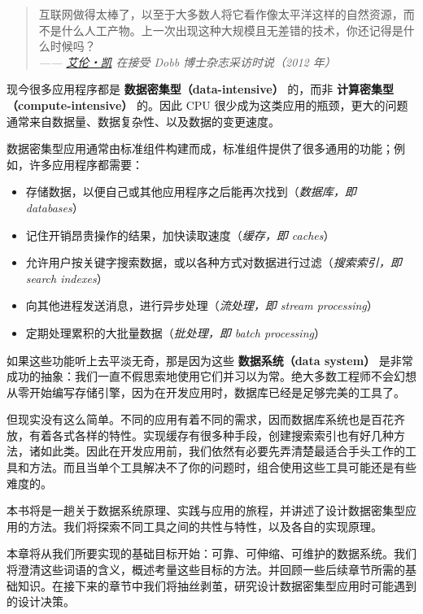 \begin{quote}
  互联网做得太棒了，以至于大多数人将它看作像太平洋这样的自然资源，而不是什么人工产物。上一次出现这种大规模且无差错的技术，你还记得是什么时候吗？\\
  \textit{—— \href{http://www.drdobbs.com/architecture-and-design/interview-with-alan-kay/240003442}{艾伦・凯} 在接受 Dobb 博士杂志采访时说（2012 年）}
\end{quote}

现今很多应用程序都是 \textbf{数据密集型（data-intensive）} 的，而非 \textbf{计算密集型（compute-intensive）} 的。因此 CPU 很少成为这类应用的瓶颈，更大的问题通常来自数据量、数据复杂性、以及数据的变更速度。

数据密集型应用通常由标准组件构建而成，标准组件提供了很多通用的功能；例如，许多应用程序都需要：

\begin{itemize}
  \item 存储数据，以便自己或其他应用程序之后能再次找到（\textit{数据库，即 databases}）
  \item 记住开销昂贵操作的结果，加快读取速度（\textit{缓存，即 caches}）
  \item 允许用户按关键字搜索数据，或以各种方式对数据进行过滤（\textit{搜索索引，即 search indexes}）
  \item 向其他进程发送消息，进行异步处理（\textit{流处理，即 stream processing}）
  \item 定期处理累积的大批量数据（\textit{批处理，即 batch processing}）
\end{itemize}

如果这些功能听上去平淡无奇，那是因为这些 \textbf{数据系统（data system）} 是非常成功的抽象：我们一直不假思索地使用它们并习以为常。绝大多数工程师不会幻想从零开始编写存储引擎，因为在开发应用时，数据库已经是足够完美的工具了。

但现实没有这么简单。不同的应用有着不同的需求，因而数据库系统也是百花齐放，有着各式各样的特性。实现缓存有很多种手段，创建搜索索引也有好几种方法，诸如此类。因此在开发应用前，我们依然有必要先弄清楚最适合手头工作的工具和方法。而且当单个工具解决不了你的问题时，组合使用这些工具可能还是有些难度的。

本书将是一趟关于数据系统原理、实践与应用的旅程，并讲述了设计数据密集型应用的方法。我们将探索不同工具之间的共性与特性，以及各自的实现原理。

本章将从我们所要实现的基础目标开始：可靠、可伸缩、可维护的数据系统。我们将澄清这些词语的含义，概述考量这些目标的方法。并回顾一些后续章节所需的基础知识。在接下来的章节中我们将抽丝剥茧，研究设计数据密集型应用时可能遇到的设计决策。

